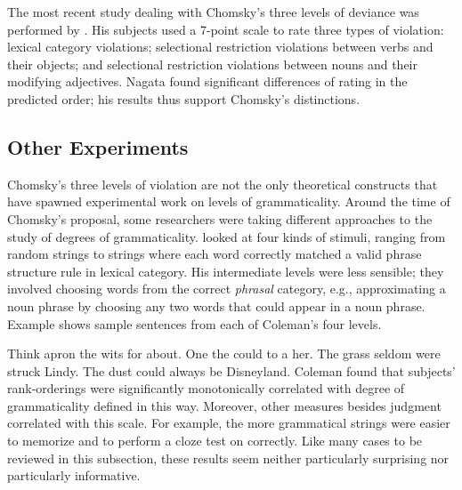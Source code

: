 The most recent study dealing with Chomsky's three levels of deviance was performed by \citet{Nagata1990b}. His subjects used a 7-point scale to rate three types of violation: lexical category violations; selectional restriction violations between verbs and their objects; and selectional restriction violations between nouns and their modifying adjectives. Nagata found significant differences of rating in the predicted  order; his results thus support Chomsky's distinctions.

\subsection{Other Experiments}\label{sec:3.3.3}

Chomsky's three levels of violation are not the only theoretical constructs that have spawned experimental work on levels of grammaticality. Around the time of Chomsky's proposal, some researchers were taking different approaches to the
study of degrees of grammaticality. \citet{Coleman1965} looked at four kinds of stimuli, ranging from random strings to strings where each word correctly matched a valid phrase structure rule in lexical category. His intermediate levels were less
sensible; they involved choosing words from the correct \textit{phrasal} category, e.g., approximating a noun phrase by choosing any two words that could appear in a noun phrase. Example  shows sample sentences from each of Coleman's four levels.

\ea \label{ex:3:7}
\ea Think apron the wits for about. 
\ex One the could to a her.
\ex The grass seldom were struck Lindy.
\ex The dust could always be Disneyland.
\z
\z
\noindent
Coleman found that subjects' rank-orderings were significantly monotonically correlated with degree of grammaticality defined in this way. Moreover, other measures besides judgment correlated with this scale. For example, the more grammatical strings were easier to memorize and to perform a cloze test on correctly. Like many cases to be reviewed in this subsection, these results seem neither particularly surprising nor particularly informative.

